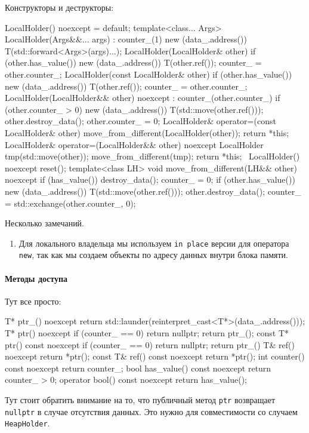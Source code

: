 Конструкторы и деструкторы:
\begin{cppcode}
LocalHolder() noexcept = default;
template<class... Args>
LocalHolder(Args&&... args) : counter_(1) {
  new (data_.address()) T(std::forward<Args>(args)...);
}
LocalHolder(LocalHolder& other) {
  if (other.has_value()) {
    new (data_.address()) T(other.ref());
    counter_ = other.counter_;
  }
}
LocalHolder(const LocalHolder& other) {
  if (other.has_value()) {
    new (data_.address()) T(other.ref());
    counter_ = other.counter_;
  }
}
LocalHolder(LocalHolder&& other) noexcept : counter_(other.counter_) {
  if (other.counter_ > 0) {
    new (data_.address()) T(std::move(other.ref()));
    other.destroy_data();
    other.counter_ = 0;
  }
}
LocalHolder& operator=(const LocalHolder& other) {
  move_from_different(LocalHolder(other));
  return *this;
}
LocalHolder& operator=(LocalHolder&& other) noexcept {
  LocalHolder tmp(std::move(other));
  move_from_different(tmp);
  return *this;
}
~LocalHolder() noexcept {
  reset();
}
template<class LH>
void move_from_different(LH&& other) noexcept {
  if (has_value()) {
    destroy_data();
    counter_ = 0;
  }
  if (other.has_value()) {
    new (data_.address()) T(std::move(other.ref()));
    other.destroy_data();
    counter_ = std::exchange(other.counter_, 0);
  }
}
\end{cppcode}
Несколько замечаний.
\begin{enumerate}
\item Для локального владельца мы используем \verb"in place" версии для оператора \verb"new", так как мы создаем объекты по адресу данных внутри блока памяти.
\end{enumerate}

\paragraph{Методы доступа}

Тут все просто:
\begin{cppcode}
T* ptr_() noexcept {
  return std::launder(reinterpret_cast<T*>(data_.address()));
}
T* ptr() noexcept {
  if (counter_ == 0)
    return nullptr;
  return ptr_();
}
const T* ptr() const noexcept {
  if (counter_ == 0)
    return nullptr;
  return ptr_()
}
T& ref() noexcept {
  return *ptr();
}
const T& ref() const noexcept {
  return *ptr();
}
int counter() const noexcept {
  return counter_;
}
bool has_value() const noexcept {
  return counter_ > 0;
}
operator bool() const noexcept {
  return has_value();
}
\end{cppcode}
Тут стоит обратить внимание на то, что публичный метод \verb"ptr" возвращает \verb"nullptr" в случае отсутствия данных.
Это нужно для совместимости со случаем \verb"HeapHolder".


